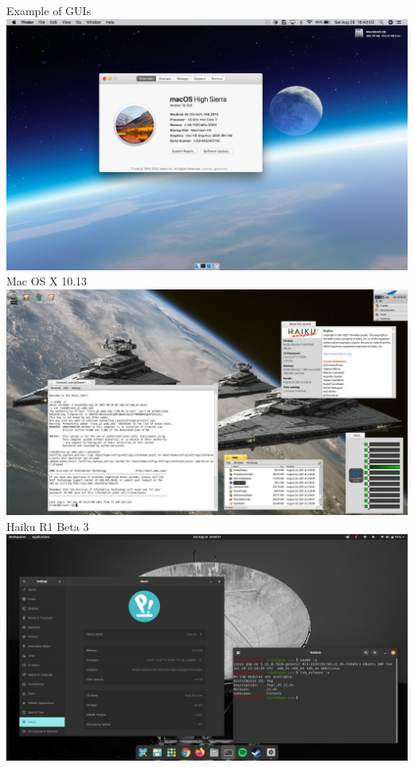 \documentclass[graphics]{beamer}
\begin{document}
\begin{frame}{Example of GUIs}
     {
        \includegraphics[scale=0.24]{L03_OperatingSystems/L3_macos.png}
        \footnotesize{Mac OS X 10.13}
    }
     {
        \includegraphics[scale=0.183]{L03_OperatingSystems/L3_Haiku.png}
        \footnotesize{Haiku R1 Beta 3}
    }
     {
        \includegraphics[scale=0.183]{L03_OperatingSystems/L03_popos.png}
}
\end{frame}
\end{document}
